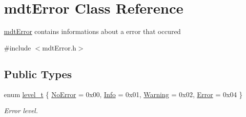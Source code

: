 \hypertarget{classmdt_error}{\section{mdt\-Error Class Reference}
\label{classmdt_error}
}


\hyperlink{classmdt_error}{mdt\-Error} contains informations about a error that occured  




{\ttfamily \#include $<$mdt\-Error.\-h$>$}

\subsection*{Public Types}
\begin{DoxyCompactItemize}
\item 
enum \hyperlink{classmdt_error_a5c8b1a040e2feaa848f6201d6b6f0cd7}{level\-\_\-t} \{ \hyperlink{classmdt_error_a5c8b1a040e2feaa848f6201d6b6f0cd7a1ba619a7f332d8fe18fb3cd270ff86eb}{No\-Error} = 0x00, 
\hyperlink{classmdt_error_a5c8b1a040e2feaa848f6201d6b6f0cd7a24688d5f5af0a3a54636fa1a4b2f60fc}{Info} = 0x01, 
\hyperlink{classmdt_error_a5c8b1a040e2feaa848f6201d6b6f0cd7a61d92805e90226faf3d1c5fd350a0ab8}{Warning} = 0x02, 
\hyperlink{classmdt_error_a5c8b1a040e2feaa848f6201d6b6f0cd7a35f5c05a7d15b6433445cdbffa6d5260}{Error} = 0x04
 \}
\begin{DoxyCompactList}\small\item\em Error level. \end{DoxyCompactList}\end{DoxyCompactItemize}

